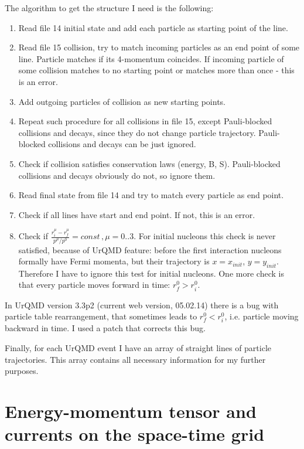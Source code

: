 \documentclass[12pt,a4paper]{report}
\begin{document}
The algorithm to get the structure I need is the following:
\begin{enumerate}
\item Read file 14 initial state and add each particle as starting point of the line.
\item Read file 15 collision, try to match incoming particles as an end point of some line. Particle matches if its 4-momentum coincides. If incoming particle of some collision matches to no starting point or matches more than once - this is an error. 
\item Add outgoing particles of collision as new starting points.
\item Repeat such procedure for all collisions in file 15, except Pauli-blocked collisions and decays, since they do not change particle trajectory. Pauli-blocked collisions and decays can be just ignored.
\item Check if collision satisfies conservation laws (energy, B, S). Pauli-blocked collisions and decays obviously do not, so ignore them.
\item Read final state from file 14 and try to match every particle as end point.
\item Check if all lines have start and end point. If not, this is an error.
\item Check if $\frac{r_i^{\mu}-r_f^{\mu}}{p^{\mu}/p^0} = const \,, \mu = 0..3$. For initial nucleons this check is never satisfied, because of UrQMD feature: before the first interaction nucleons formally have Fermi momenta, but their trajectory is $x=x_{init}$, $y=y_{init}$. Therefore I have to ignore this test for initial nucleons. One more check is that every particle moves forward in time: $r_f^0 > r_i^0$. 
\end{enumerate}

In UrQMD version 3.3p2 (current web version, 05.02.14) there is a bug with particle table rearrangement, that sometimes leads to  $r_f^0 < r_i^0$, i.e. particle moving backward in time. I used a patch that corrects this bug. 

Finally, for each UrQMD event I have an array of straight lines of particle trajectories. This array contains all necessary information for my further purposes. 



\section{Energy-momentum tensor and currents on the space-time grid}
\end{document}
